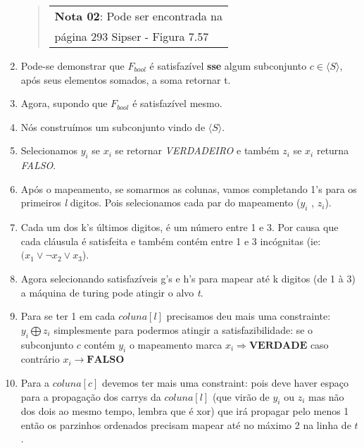 \documentclass[12pt, a4paper]{article}
\begin{document}
\begin{enumerate}
\begin{quote}
  \flushright
    \begin{tabular}{|l}
\textbf{Nota 02}: Pode ser encontrada na\\ página 293 Sipser - Figura 7.57
  \end{tabular}
\end{quote}


\item Pode-se demonstrar que $F_{bool}$ é satisfazível \textbf{sse} algum subconjunto $c \in \langle S \rangle$, após seus elementos somados, a soma retornar t.

\item Agora, supondo que $F_{bool}$ é satisfazível mesmo.

\item Nós construímos um subconjunto vindo de $\langle S \rangle$.

\item Selecionamos $y_i$ se $x_i$ se retornar \textit{VERDADEIRO} e também $z_i$ se $x_i$ returna \textit{FALSO}.

\item Após o mapeamento, se somarmos as colunas, vamos completando 1's para os primeiros \textit{l} digitos. Pois selecionamos cada par do mapeamento ($y_i$ , $z_i$).

\item Cada um dos k's últimos digitos, é um número entre 1 e 3. Por causa que cada cláusula é satisfeita e também contém entre 1 e 3 incógnitas (ie: $(x_1 \vee \neg x_2 \vee x_3$).

\item Agora selecionando satisfazíveis g's e h's para mapear até k digitos (de 1 à 3) a máquina de turing pode atingir o alvo \textit{t}.

\item Para se ter 1 em cada $coluna[l]$ precisamos deu mais uma constrainte: $y_i \bigoplus z_i$ simplesmente para podermos atingir a satisfazibilidade: se o subconjunto $c$ contém $y_i$ o mapeamento marca $x_i \Rightarrow \textbf{VERDADE}$ caso contrário $x_i \rightarrow \textbf{FALSO}$

\item Para a $coluna[c]$ devemos ter mais uma constraint: pois deve haver espaço para a propagação dos carrys da $coluna[l]$ (que virão de $y_i$ ou $z_i$ mas não dos dois ao mesmo tempo, lembra que é xor) que irá propagar pelo menos 1 então os parzinhos ordenados precisam mapear até no máximo 2 na linha de $t$.


\end{enumerate}
\end{document}
